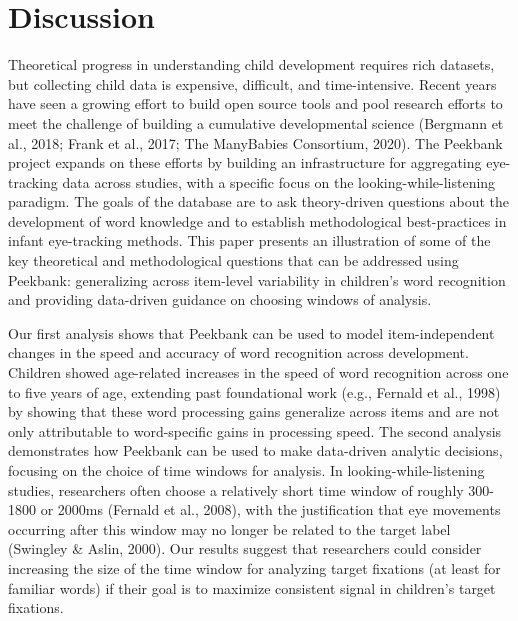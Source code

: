 \documentclass[10pt, letterpaper]{article}
\begin{document}
\hypertarget{discussion}{%
\section{Discussion}\label{discussion}}

Theoretical progress in understanding child development requires rich
datasets, but collecting child data is expensive, difficult, and
time-intensive. Recent years have seen a growing effort to build open
source tools and pool research efforts to meet the challenge of building
a cumulative developmental science (Bergmann et al., 2018; Frank et al.,
2017; The ManyBabies Consortium, 2020). The Peekbank project expands on
these efforts by building an infrastructure for aggregating eye-tracking
data across studies, with a specific focus on the
looking-while-listening paradigm. The goals of the database are to ask
theory-driven questions about the development of word knowledge and to
establish methodological best-practices in infant eye-tracking methods.
This paper presents an illustration of some of the key theoretical and
methodological questions that can be addressed using Peekbank:
generalizing across item-level variability in children's word
recognition and providing data-driven guidance on choosing windows of
analysis.

Our first analysis shows that Peekbank can be used to model
item-independent changes in the speed and accuracy of word recognition
across development. Children showed age-related increases in the speed
of word recognition across one to five years of age, extending past
foundational work (e.g., Fernald et al., 1998) by showing that these
word processing gains generalize across items and are not only
attributable to word-specific gains in processing speed. The second
analysis demonstrates how Peekbank can be used to make data-driven
analytic decisions, focusing on the choice of time windows for analysis.
In looking-while-listening studies, researchers often choose a
relatively short time window of roughly 300-1800 or 2000ms (Fernald et
al., 2008), with the justification that eye movements occurring after
this window may no longer be related to the target label (Swingley \&
Aslin, 2000). Our results suggest that researchers could consider
increasing the size of the time window for analyzing target fixations
(at least for familiar words) if their goal is to maximize consistent
signal in children's target fixations.
\end{document}
